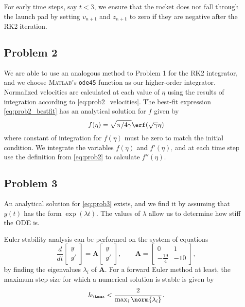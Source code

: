 \documentclass[12pt]{article}
\begin{document}
For early time steps, say $t < 3$, we ensure that the rocket does not fall through the launch pad by setting $v_{n+1}$ and $z_{n+1}$ to zero if they are negative after the RK2 iteration.

\subsection{Problem 2}

We are able to use an analogous method to Problem 1 for the RK2 integrator, and we choose \textsc{Matlab}'s \lstinline|ode45| function as our higher-order integrator. Normalized velocities are calculated at each value of $\eta$ using the results of integration according to \eqref{eq:prob2_velocities}. The best-fit expression \eqref{eq:prob2_bestfit} has an analytical solution for $f$ given by
\begin{equation}
f(\eta) = \sqrt{\pi / 4 \gamma} \erf(\sqrt{\gamma} \eta)
\end{equation}
where constant of integration for $f(\eta)$ must be zero to match the initial condition. We integrate the variables $f(\eta)$ and $f'(\eta)$, and at each time step use the definition from \eqref{eq:prob2} to calculate $f''(\eta)$.

\subsection{Problem 3}

An analytical solution for \eqref{eq:prob3} exists, and we find it by assuming that $y(t)$ has the form $\exp(\lambda t)$. The values of $\lambda$ allow us to determine how stiff the ODE is.

Euler stability analysis can be performed on the system of equations
\begin{equation}
\frac{d}{dt}
\begin{bmatrix}
y \\
y'
\end{bmatrix}
=
\mathbf{A}
\begin{bmatrix}
y \\
y'
\end{bmatrix}
, \qquad
\mathbf{A}
=
\begin{bmatrix}
0 & 1 \\
-\frac{19}{4} & -10
\end{bmatrix}
,
\end{equation}
by finding the eigenvalues $\lambda_i$ of $\mathbf{A}$. For a forward Euler method at least, the maximum step size for which a numerical solution is stable is given by
\begin{equation}
h_\tmax < \frac{2}{\max_i\norm{\lambda_i}}
.
\end{equation}
\end{document}
